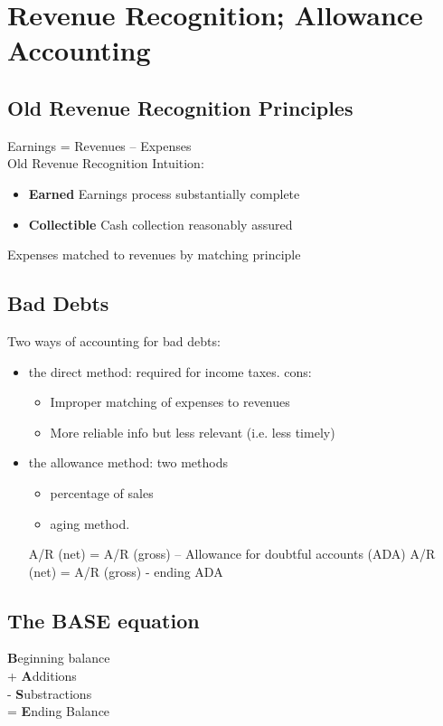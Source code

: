 \section{Revenue Recognition; Allowance Accounting}

\subsection*{Old Revenue Recognition Principles}
Earnings = Revenues – Expenses \\
Old Revenue Recognition Intuition:
\begin{itemize}
	\item \textbf{Earned} Earnings process substantially complete
	\item \textbf{Collectible} Cash collection reasonably assured
\end{itemize}
Expenses matched to revenues by matching principle


\subsection*{Bad Debts}

Two ways of accounting for bad debts:
\begin{itemize}
	\item the direct method: required for income taxes. cons: 
	\begin{itemize}
		\item Improper matching of expenses to revenues
		\item More reliable info but less relevant (i.e. less timely)
	\end{itemize}
	\item the allowance method: two methods
	\begin{itemize}
		\item percentage of sales
		\item aging method.
	\end{itemize}

A/R (net) = A/R (gross) – Allowance for doubtful accounts (ADA)
A/R (net) = A/R (gross) - ending ADA
	
\end{itemize}

\subsection*{The BASE equation}

\textbf{B}eginning balance\\
+ \textbf{A}dditions \\
- \textbf{S}ubstractions \\
= \textbf{E}nding Balance

